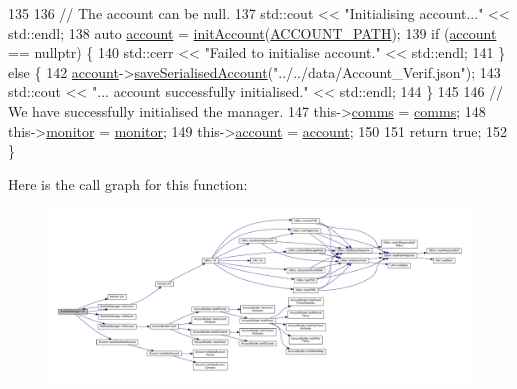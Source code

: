 \begin{DoxyCode}
135 
136     \textcolor{comment}{// The account can be null.}
137     std::cout << \textcolor{stringliteral}{"Initialising account..."} << std::endl;
138     \textcolor{keyword}{auto} \hyperlink{class_bee_safe_manager_a52bc9bc8c1ea9608b83d603b142443b0}{account} = \hyperlink{class_bee_safe_manager_a7395aeacd246ce69c65f255a2eab1d04}{initAccount}(\hyperlink{_bee_safe_8cpp_aeadb35b2afa47797b56f17423460fad8}{ACCOUNT\_PATH});
139     \textcolor{keywordflow}{if} (\hyperlink{class_bee_safe_manager_a52bc9bc8c1ea9608b83d603b142443b0}{account} == \textcolor{keyword}{nullptr}) \{
140         std::cerr << \textcolor{stringliteral}{"Failed to initialise account."} << std::endl;
141     \} \textcolor{keywordflow}{else} \{
142         \hyperlink{class_bee_safe_manager_a52bc9bc8c1ea9608b83d603b142443b0}{account}->\hyperlink{class_account_a9ff3a257536bc933e0a39207bb89243d}{saveSerialisedAccount}(\textcolor{stringliteral}{"../../data/Account\_Verif.json"});
143         std::cout << \textcolor{stringliteral}{"... account successfully initialised."} << std::endl;
144     \}
145 
146     \textcolor{comment}{// We have successfully initialised the manager.}
147     this->\hyperlink{class_bee_safe_manager_a80b19afbb679d08be14d67a45447f9e1}{comms} = \hyperlink{class_bee_safe_manager_a80b19afbb679d08be14d67a45447f9e1}{comms};
148     this->\hyperlink{class_bee_safe_manager_a3b885b4fb364228c914095f2e670f9af}{monitor} = \hyperlink{class_bee_safe_manager_a3b885b4fb364228c914095f2e670f9af}{monitor};
149     this->\hyperlink{class_bee_safe_manager_a52bc9bc8c1ea9608b83d603b142443b0}{account} = \hyperlink{class_bee_safe_manager_a52bc9bc8c1ea9608b83d603b142443b0}{account};
150 
151     \textcolor{keywordflow}{return} \textcolor{keyword}{true};
152 \}
\end{DoxyCode}
Here is the call graph for this function\+:\nopagebreak
\begin{figure}[H]
\begin{center}
\leavevmode
\includegraphics[width=350pt]{d5/d75/class_bee_safe_manager_a2f16b09c454e21c887d14ac5483973cf_cgraph}
\end{center}
\end{figure}
